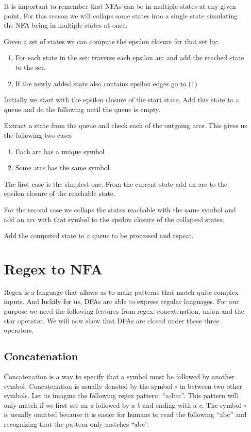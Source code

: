 It is important to remember that NFAs can be in multiple states at any given point. For this reason we will collaps some states into a single state simulating the NFA being in multiple states at once.

Given a set of states we can compute the epsilon closure for that set  by:
\begin{enumerate}
      \item For each state in the set: traverse each epsilon arc and add the reached state to the set.
      \item If the newly added state also contains epsilon edges go to (1)
\end{enumerate}


Initially we start with the epsilon closure of the start state. Add this state to a queue and do the following until the queue is empty. 

Extract a state from the queue and check each of the outgoing arcs. This gives us the following two cases
\begin{enumerate}
      \item Each arc has a unique symbol
      \item Some arcs has the same symbol
\end{enumerate}

The first case is the simplest one. From the current state add an arc to the epsilon closure of the reachable state. 

For the second case we collaps the states reachable with the same symbol and add an arc with that symbol to the epsilon closure of the collapsed states. 

Add the computed state to a queue to be processed and repeat.


\section{Regex to NFA}

Regex is a language that allows us to make patterns that match quite complex inputs. And luckily for us, DFAs are able to express regular languages. For our purpose we need the following features from regex: concatenation, union and the star operator. We will now show that DFAs are closed under these three operators. 

\subsection{Concatenation}
Concatenation is a way to specify that a symbol must be followed by another symbol. Concatenation is usually denoted by the symbol $\circ$ in between two other symbols. Let us imagine the following regex pattern: ``a$\circ$b$\circ$c''. This pattern will only match if we first see an \textit{a} followed by a \textit{b} and ending with a \textit{c}. The symbol $\circ$ is usually omitted because it is easier for humans to read the following ``abc'' and recognizing that the pattern only matches ``abc''.

